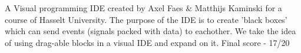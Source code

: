\begin{cventries}
{\begin{cvitems}\item A Visual programming IDE created by Axel Faes \& Matthijs Kaminski for a course of Hasselt University. The purpose of the IDE is to create 'black boxes' which can send events (signals packed with data) to eachother. We take the idea of using drag-able blocks in a visual IDE and expand on it. Final score - 17/20
\end{cvitems}
}


\end{cventries}
